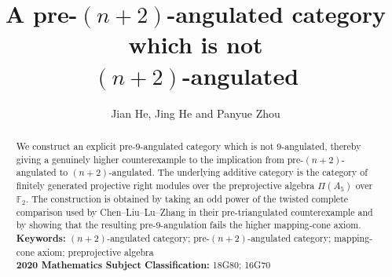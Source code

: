 \documentclass[12pt, twoside]{article}
\renewcommand{\cal}{\mathcal}
\numberwithin{equation}{section}
\begin{document}
\baselineskip=15pt
\title{\Large{\bf A pre-$(n+2)$-angulated category which is not\\[2mm] $(n+2)$-angulated}}
\medskip
\author{Jian He, Jing He and Panyue Zhou}%
{}

\date{}

\maketitle
\def\blue{\color{blue}}
\def\red{\color{red}}


\newtheorem{theorem}{Theorem}[section]
\newtheorem{lemma}[theorem]{Lemma}
\newtheorem{corollary}[theorem]{Corollary}
\newtheorem{proposition}[theorem]{Proposition}
\newtheorem{conjecture}{Conjecture}
\theoremstyle{definition}
\newtheorem{definition}[theorem]{Definition}
\newtheorem{question}[theorem]{Question}
\newtheorem{remark}[theorem]{Remark}
\newtheorem{remark*}[]{Remark}
\newtheorem{example}[theorem]{Example}
\newtheorem{example*}[]{Example}
\newtheorem{condition}[theorem]{Condition}
\newtheorem{condition*}[]{Condition}
\newtheorem{construction}[theorem]{Construction}
\newtheorem{construction*}[]{Construction}

\newtheorem{assumption}[theorem]{Assumption}
\newtheorem{assumption*}[]{Assumption}


\baselineskip=17pt
\parindent=0.5cm




\begin{abstract}
\baselineskip=16pt
We construct an explicit pre-$9$-angulated category which is not $9$-angulated, thereby giving a genuinely higher counterexample to the implication from pre-$(n+2)$-angulated to $(n+2)$-angulated. The underlying additive category is the category of finitely generated projective right modules over the preprojective algebra $\Pi(A_5)$ over $\mathbb F_2$. The construction is obtained by taking an odd power of the twisted complete comparison used by Chen--Liu--Lu--Zhang in their pre-triangulated counterexample and by showing that the resulting pre-$9$-angulation fails the higher mapping-cone axiom.
\\[0.5cm]
\textbf{Keywords:} $(n+2)$-angulated category; pre-$(n+2)$-angulated category; mapping-cone axiom; preprojective algebra\\[0.2cm]
\textbf{2020 Mathematics Subject Classification:} 18G80; 16G70
\medskip
\end{abstract}
\end{document}
